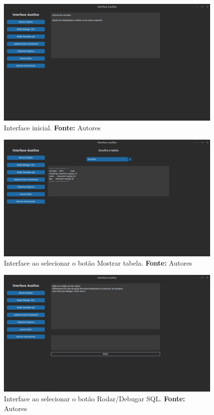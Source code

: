 \begin{figure}[H]
    \centering
    \includegraphics[scale=0.3]{images/interface.png}
    \caption{Interface inicial. \textbf{Fonte:} Autores}
    \label{fig:interface}
\end{figure}

\begin{figure}[H]
    \centering
    \includegraphics[scale=0.3]{images/mostratab.png}
    \caption{Interface ao selecionar o botão Mostrar tabela. \textbf{Fonte:} Autores}
    \label{fig:mostratab}
\end{figure}

\begin{figure}[H]
    \centering
    \includegraphics[scale=0.3]{images/rodarsql.png}
    \caption{Interface ao selecionar o botão Rodar/Debugar SQL. \textbf{Fonte:} Autores}
    \label{fig:rodarsql}
\end{figure}

